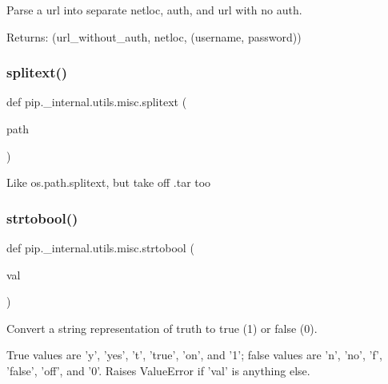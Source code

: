 \begin{DoxyVerb}Parse a url into separate netloc, auth, and url with no auth.

Returns: (url_without_auth, netloc, (username, password))
\end{DoxyVerb}
 \mbox{\label{namespacepip_1_1__internal_1_1utils_1_1misc_a6060934981bde6e18b7e138df65640ec}} 
\subsubsection{\texorpdfstring{splitext()}{splitext()}}
{\footnotesize\ttfamily def pip.\+\_\+internal.\+utils.\+misc.\+splitext (\begin{DoxyParamCaption}\item[{}]{path }\end{DoxyParamCaption})}

\begin{DoxyVerb}Like os.path.splitext, but take off .tar too\end{DoxyVerb}
 \mbox{\label{namespacepip_1_1__internal_1_1utils_1_1misc_a98abe89494768a7d24cda2c624c12600}} 
\subsubsection{\texorpdfstring{strtobool()}{strtobool()}}
{\footnotesize\ttfamily def pip.\+\_\+internal.\+utils.\+misc.\+strtobool (\begin{DoxyParamCaption}\item[{}]{val }\end{DoxyParamCaption})}

\begin{DoxyVerb}Convert a string representation of truth to true (1) or false (0).

True values are 'y', 'yes', 't', 'true', 'on', and '1'; false values
are 'n', 'no', 'f', 'false', 'off', and '0'.  Raises ValueError if
'val' is anything else.
\end{DoxyVerb}
 \mbox{\label{namespacepip_1_1__internal_1_1utils_1_1misc_a9fa0f2c612a0507ad35d4d55c7744e72}} 
